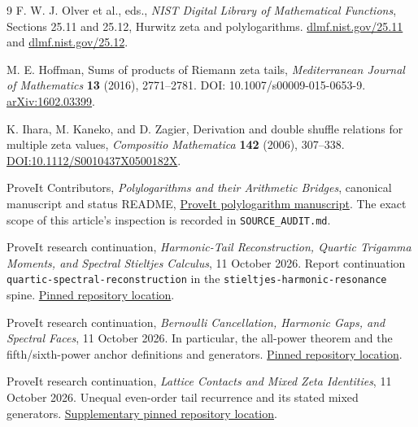 \documentclass[11pt,letterpaper]{article}
\numberwithin{equation}{section}
\theoremstyle{definition}\newtheorem{definition}[theorem]{Definition}
\theoremstyle{remark}\newtheorem{remark}[theorem]{Remark}
\newcommand{\sref}[1]{\texttt{#1}}
\begin{document}
\begin{thebibliography}{9}
F. W. J. Olver et al., eds., \emph{NIST Digital Library of Mathematical
Functions}, Sections 25.11 and 25.12, Hurwitz zeta and polylogarithms.
\href{https://dlmf.nist.gov/25.11}{dlmf.nist.gov/25.11} and
\href{https://dlmf.nist.gov/25.12}{dlmf.nist.gov/25.12}.

M. E. Hoffman, Sums of products of Riemann zeta tails,
\emph{Mediterranean Journal of Mathematics} \textbf{13} (2016),
2771--2781. DOI: 10.1007/s00009-015-0653-9.
\href{https://arxiv.org/abs/1602.03399}{arXiv:1602.03399}.

K. Ihara, M. Kaneko, and D. Zagier,
Derivation and double shuffle relations for multiple zeta values,
\emph{Compositio Mathematica} \textbf{142} (2006), 307--338.
\href{https://doi.org/10.1112/S0010437X0500182X}{DOI:10.1112/S0010437X0500182X}.

ProveIt Contributors, \emph{Polylogarithms and their Arithmetic Bridges},
canonical manuscript and status README,
\href{https://github.com/VladimirReshetnikov/ProveIt/tree/main/Analysis/Polylogarithms/docs/manuscript}{ProveIt polylogarithm manuscript}.
The exact scope of this article's inspection is recorded in
\sref{SOURCE\_AUDIT.md}.

ProveIt research continuation, \emph{Harmonic-Tail Reconstruction,
Quartic Trigamma Moments, and Spectral Stieltjes Calculus},
11 October 2026. Report continuation
\sref{quartic-spectral-reconstruction} in the
\sref{stieltjes-harmonic-resonance} spine.
\href{https://github.com/VladimirReshetnikov/ProveIt/tree/0dfef47533f8bbf23d12aa4f1894b9bea61f6e0a/Analysis/Polylogarithms/docs/reports/stieltjes-harmonic-resonance/continuations/quartic-spectral-reconstruction}{Pinned repository location}.

ProveIt research continuation, \emph{Bernoulli Cancellation,
Harmonic Gaps, and Spectral Faces}, 11 October 2026.
In particular, the all-power theorem and the fifth/sixth-power
anchor definitions and generators.
\href{https://github.com/VladimirReshetnikov/ProveIt/tree/0dfef47533f8bbf23d12aa4f1894b9bea61f6e0a/Analysis/Polylogarithms/docs/reports/stieltjes-harmonic-resonance/continuations/bernoulli-tails-spectral-faces}{Pinned repository location}.

ProveIt research continuation, \emph{Lattice Contacts and Mixed Zeta
Identities}, 11 October 2026. Unequal even-order tail recurrence
and its stated mixed generators.
\href{https://github.com/VladimirReshetnikov/ProveIt/tree/cc569dca8622dfc8fa02906da37d0a1b8831b5e7/Analysis/Polylogarithms/docs/reports/stieltjes-correlation-calculus/continuations/lattice-contacts-mixed-zeta}{Supplementary pinned repository location}.
\end{thebibliography}
\end{document}
